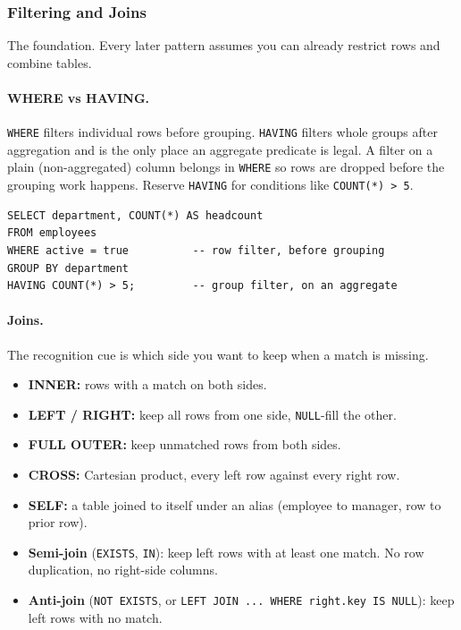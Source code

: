 \subsubsection{Filtering and Joins}

The foundation. Every later pattern assumes you can already restrict rows and
combine tables.

\paragraph{WHERE vs HAVING.} \texttt{WHERE} filters individual rows before
grouping. \texttt{HAVING} filters whole groups after aggregation and is the
only place an aggregate predicate is legal. A filter on a plain
(non-aggregated) column belongs in \texttt{WHERE} so rows are dropped before
the grouping work happens. Reserve \texttt{HAVING} for conditions like
\texttt{COUNT(*) > 5}.

\begin{lstlisting}[style=sql, caption={WHERE prunes rows, HAVING prunes groups}]
SELECT department, COUNT(*) AS headcount
FROM employees
WHERE active = true          -- row filter, before grouping
GROUP BY department
HAVING COUNT(*) > 5;         -- group filter, on an aggregate
\end{lstlisting}

\vspace{-1ex}

\newpage

\paragraph{Joins.} The recognition cue is which side you want to keep when a
match is missing.
\begin{itemize}[label=$\circ$]
  \item \textbf{INNER:} rows with a match on both sides.
  \item \textbf{LEFT / RIGHT:} keep all rows from one side, \texttt{NULL}-fill the other.
  \item \textbf{FULL OUTER:} keep unmatched rows from both sides.
  \item \textbf{CROSS:} Cartesian product, every left row against every right row.
  \item \textbf{SELF:} a table joined to itself under an alias (employee to manager, row to prior row).
  \item \textbf{Semi-join} (\texttt{EXISTS}, \texttt{IN}): keep left rows with at least one match. No row duplication, no right-side columns.
  \item \textbf{Anti-join} (\texttt{NOT EXISTS}, or \texttt{LEFT JOIN ... WHERE right.key IS NULL}): keep left rows with no match.
\end{itemize}

